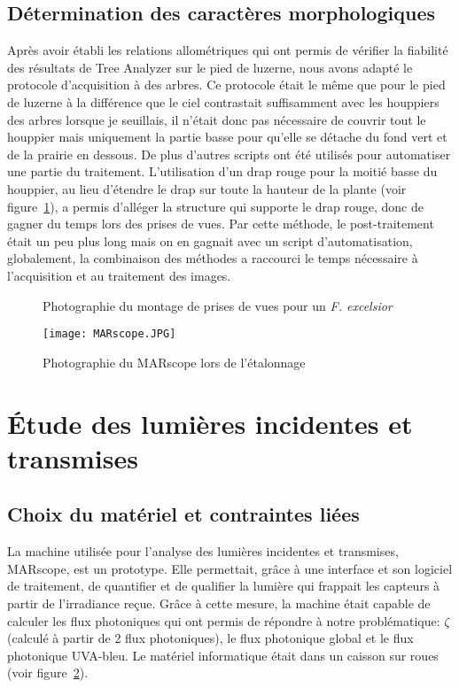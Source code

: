 \documentclass[12pt]{report}
\begin{document}
\subsection{Détermination des caractères morphologiques}

Après avoir établi les relations allométriques qui ont permis de vérifier la
fiabilité des résultats de Tree Analyzer sur le pied de luzerne, nous avons adapté le protocole
d'acquisition à des arbres. Ce protocole était le même que pour le pied de luzerne à la différence que le ciel
contrastait suffisamment avec les houppiers des arbres lorsque je seuillais, il
n'était donc pas nécessaire de couvrir tout le houppier mais uniquement la partie
basse pour qu'elle se détache du fond vert et de la prairie en dessous.
De plus d'autres scripts ont été utilisés pour automatiser une partie
du traitement. L'utilisation
d'un drap rouge pour la moitié basse du houppier, au lieu d'étendre le drap sur
toute la hauteur de la plante (voir figure~\ref{fig:montage_finale}), a permis d'alléger
la structure qui supporte le drap rouge, donc de gagner
du temps lors des prises de vues. Par cette méthode, le post-traitement était un
peu plus long mais on en gagnait avec un script d'automatisation, globalement, la
combinaison des méthodes a raccourci le temps nécessaire à l'acquisition et au
traitement des images.

\begin{figure}
  \centering
  \def\svgwidth{\linewidth}
  
  \caption{Photographie du montage de prises de vues pour un \textit{F. excelsior}\label{fig:montage_finale}}
\end{figure}

\begin{figure}
  \centering
  \texttt{[image: MARscope.JPG]}
  \caption{Photographie du MARscope lors de l'étalonnage\label{fig:MARscope}}
\end{figure}

\section{Étude des lumières incidentes et transmises}

\subsection{Choix du matériel et contraintes liées}


La machine utilisée pour l'analyse des lumières incidentes et transmises, MARscope,
est un prototype. Elle permettait, grâce à une interface et son logiciel
de traitement, de quantifier et de qualifier la lumière qui frappait les capteurs
à partir de l'irradiance reçue. Grâce à cette mesure, la machine était capable de
calculer les flux photoniques qui ont permis de répondre à notre problématique:
$\zeta$ (calculé à partir de 2 flux photoniques), le flux photonique
global et le flux photonique UVA-bleu. Le matériel informatique était dans un caisson sur roues
(voir figure~\ref{fig:MARscope}).
\end{document}
